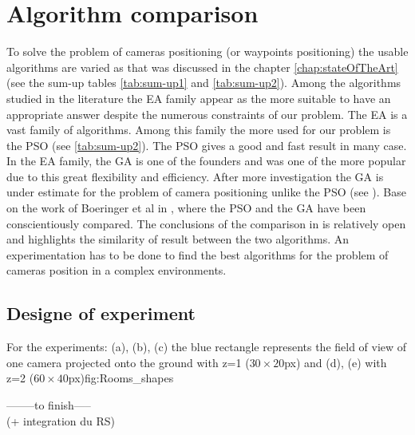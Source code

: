 \section{Algorithm comparison }\label{sec:GAvsPSO} 
%
To solve the problem of cameras positioning (or waypoints positioning) the usable algorithms are varied as that was discussed in the chapter \ref{chap:stateOfTheArt} (see the sum-up tables \ref{tab:sum-up1} and \ref{tab:sum-up2}).
Among the algorithms studied in the literature the EA family appear as the more suitable to have an appropriate answer despite the numerous constraints of our problem. The EA is a vast family of algorithms. Among this family the more used for our problem is the PSO (see \ref{tab:sum-up2}). The PSO gives a good and fast result in many case. In the EA family, the GA is one of the founders and was one of the more popular due to this great flexibility and efficiency.
 After more investigation the GA is under estimate for the problem of camera positioning unlike the PSO (see \citep{33*reddy2012,8*zhou2011,84*xu2011,143*maji2015,193*fu2014,194*fu2010}).
 Base on the work of Boeringer et al in \citep{78*boeringer2004}, where the PSO and the GA have been conscientiously compared. The conclusions  of the comparison in \citep{78*boeringer2004} is relatively open and highlights the similarity of result between the two algorithms. An experimentation has to be done to find the best algorithms for the problem of cameras position in a complex environments. 




\subsection{Designe of experiment }\label{sec:DoE}
\begin{mfigures}[!]{For the experiments: (a), (b), (c) the blue rectangle represents the field of view of one camera projected onto the ground  with z=1 ($30 \times 20 $px) and (d), (e) with z=2 ($60 \times 40 $px)}{fig:Rooms_shapes} \centering
{}
\hspace{1cm}
\hspace{1cm}
\end{mfigures}
--------to finish-----\\ (+ integration du RS)\\

